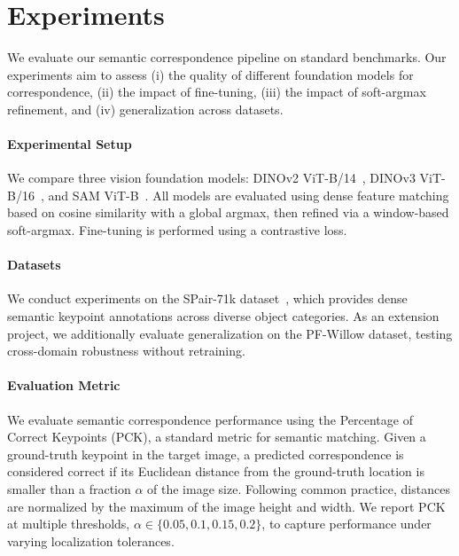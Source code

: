 \section{Experiments}
\label{sec:experiments}

We evaluate our semantic correspondence pipeline on standard benchmarks.
Our experiments aim to assess (i) the quality of different foundation models for correspondence, (ii) the impact of fine-tuning, (iii) the impact of soft-argmax refinement, and (iv) generalization across datasets.


\paragraph{Experimental Setup}

We compare three vision foundation models: DINOv2 ViT-B/14~\cite{oquab2023dinov2}, DINOv3 ViT-B/16~\cite{simeoni2025dinov3}, and SAM ViT-B~\cite{kirillov2023segment}.
All models are evaluated using dense feature matching based on cosine similarity with a global argmax, then refined via a window-based soft-argmax.
Fine-tuning is performed using a contrastive loss.


\paragraph{Datasets}

We conduct experiments on the SPair-71k dataset~\cite{min2019spair}, which provides dense semantic keypoint annotations across diverse object categories.
As an extension project, we additionally evaluate generalization on the PF-Willow dataset, testing cross-domain robustness without retraining.


\paragraph{Evaluation Metric}

We evaluate semantic correspondence performance using the Percentage of Correct Keypoints (PCK), a standard metric for semantic matching.
Given a ground-truth keypoint in the target image, a predicted correspondence is considered correct if its Euclidean distance from the ground-truth location is smaller than a fraction $\alpha$ of the image size.
Following common practice, distances are normalized by the maximum of the image height and width.
We report PCK at multiple thresholds, $\alpha \in \{0.05, 0.1, 0.15, 0.2\}$, to capture performance under varying localization tolerances.

